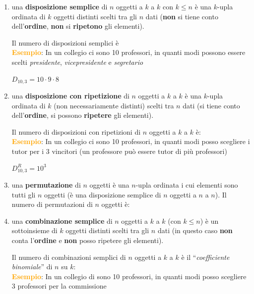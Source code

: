 \begin{enumerate}[nosep]
    \item una \textbf{disposizione semplice} di $n$ oggetti a $k$ a $k$ con $k \leq n$ è una $k$-upla ordinata di $k$ oggetti distinti scelti tra gli $n$ dati (\textbf{non} si tiene conto dell'\textbf{ordine}, \textbf{non} si \textbf{ripetono} gli elementi).
    \begin{boxA}
        Il numero di disposizioni semplici è  \\
        \textcolor{orange}{\textbf{Esempio}}: In un collegio ci sono 10 professori, in quanti modi possono essere scelti \textit{presidente}, \textit{vicepresidente} e \textit{segretario}
        
        {\centering
            $D_{10, 3} = 10 \cdot 9 \cdot 8$
        \par}
    \end{boxA}
    \item una \textbf{disposizione con ripetizione} di $n$ oggetti a $k$ a $k$ è una $k$-upla ordinata di $k$ (non necessariamente distinti) scelti tra $n$ dati (si tiene conto dell'\textbf{ordine}, si possono \textbf{ripetere} gli elementi).
    \begin{boxA}
        Il numero di disposizioni con ripetizioni di $n$ oggetti a $k$ a $k$ è:  \\
        \textcolor{orange}{\textbf{Esempio}}: In un collegio ci sono 10 professori, in quanti modi posso scegliere i tutor per i 3 vincitori (un professore può essere tutor di più professori)

        {\centering
            $D^R_{10,3} = 10^3$
        \par}
    \end{boxA}
    
    \newpage
    \item una \textbf{permutazione} di $n$ oggetti è una $n$-upla ordinata i cui elementi sono tutti gli $n$ oggetti (è una disposizione semplice di $n$ oggetti a $n$ a $n$). Il numero di permutazioni di $n$ oggetti è:
    
    {\centering
    \par}
    
    \item una \textbf{combinazione semplice} di $n$ oggetti a $k$ a $k$ (con $k \leq n$) è un sottoinsieme di $k$ oggetti distinti scelti tra gli $n$ dati (in questo caso \textbf{non} conta l'\textbf{ordine} e \textbf{non} posso ripetere gli elementi).
    \begin{boxA}
        Il numero di combinazioni semplici di $n$ oggetti a $k$ a $k$ è il ``\textit{coefficiente binomiale}'' di $n$ su $k$:  \\
        \textcolor{orange}{\textbf{Esempio}}: In un collegio di sono 10 professori, in quanti modi posso scegliere 3 professori per la commissione


\end{boxA}
\end{enumerate}
